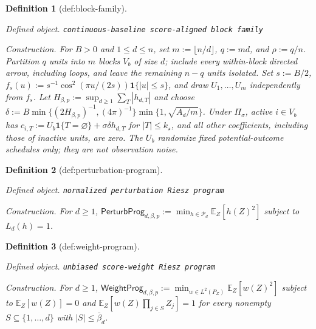 \documentclass{article}
\newtheorem{definition}{Definition}
\begin{document}
\begin{definition}[def:block-family]\label{def:block-family}
\par\smallskip\noindent\emph{Defined object.} \texttt{continuous-\allowbreak{}baseline score-\allowbreak{}aligned block family}
\par\smallskip\noindent\emph{Construction.} For \(B>0\) and \(1\le d\le n\), set \(m:=\lfloor n/d\rfloor\), \(q:=md\), and \(\rho:=q/n\). Partition \(q\) units into \(m\) blocks \(V_b\) of size \(d\); include every within-block directed arrow, including loops, and leave the remaining \(n-q\) units isolated. Set \(s:=B/2\), \(f_s(u):=s^{-1}\cos^2(\pi u/(2s))\mathbf1\{|u|\le s\}\), and draw \(U_1,\ldots,U_m\) independently from \(f_s\). Let \(H_{\beta,p}:=\sup_{d\ge1}\sum_T|h_{d,T}|\) and choose \(\delta:=B\min\{(2H_{\beta,p})^{-1},(4\pi)^{-1}\}\min\{1,\sqrt{A_d/m}\}\). Under \(\Pi_\sigma\), active \(i\in V_b\) has \(c_{i,T}:=U_b\mathbf1\{T=\varnothing\}+\sigma\delta h_{d,T}\) for \(|T|\le k_\star\), and all other coefficients, including those of inactive units, are zero. The \(U_b\) randomize fixed potential-outcome schedules only; they are not observation noise.
\end{definition}

\begin{definition}[def:perturbation-program]\label{def:perturbation-program}
\par\smallskip\noindent\emph{Defined object.} \texttt{normalized perturbation Riesz program}
\par\smallskip\noindent\emph{Construction.} For \(d\ge1\), \(\mathsf{PerturbProg}_{d,\beta,p}:=\min_{h\in\mathcal P_d}\mathbb E_Z[h(Z)^2]\) subject to \(L_d(h)=1\).
\end{definition}

\begin{definition}[def:weight-program]\label{def:weight-program}
\par\smallskip\noindent\emph{Defined object.} \texttt{unbiased score-\allowbreak{}weight Riesz program}
\par\smallskip\noindent\emph{Construction.} For \(d\ge1\), \(\mathsf{WeightProg}_{d,\beta,p}:=\min_{w\in L^2(P_Z)}\mathbb E_Z[w(Z)^2]\) subject to \(\mathbb E_Z[w(Z)]=0\) and \(\mathbb E_Z[w(Z)\prod_{j\in S}Z_j]=1\) for every nonempty \(S\subseteq\{1,\ldots,d\}\) with \(|S|\le\bar\beta_d\).
\end{definition}
\end{document}
